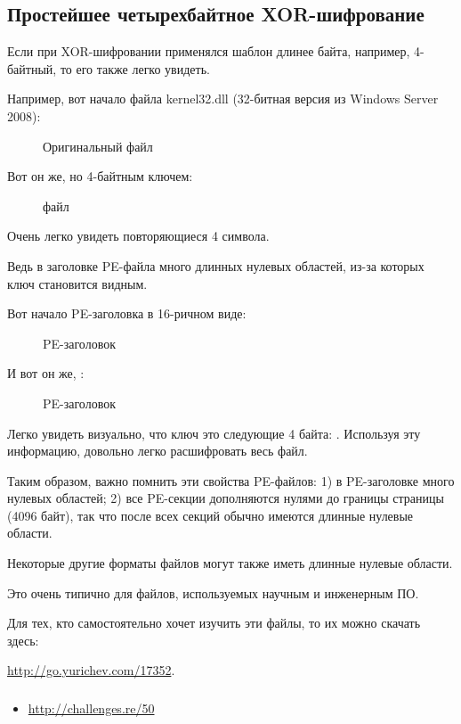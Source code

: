 \clearpage
\subsection{Простейшее четырехбайтное XOR-шифрование}

Если при XOR-шифровании применялся шаблон длинее байта, например, 4-байтный, то его также легко увидеть.

Например, вот начало файла kernel32.dll (32-битная версия из Windows Server 2008):

\begin{figure}[H]
\centering
{}
\caption{Оригинальный файл}
\end{figure}

\clearpage
Вот он же, но  4-байтным ключем:

\begin{figure}[H]
\centering
{}
\caption{ файл}
\end{figure}

Очень легко увидеть повторяющиеся 4 символа.

Ведь в заголовке PE-файла много длинных нулевых областей, из-за которых ключ становится видным.

\clearpage
Вот начало PE-заголовка в 16-ричном виде:

\begin{figure}[H]
\centering
{}
\caption{PE-заголовок}
\end{figure}

\clearpage
И вот он же, :

\begin{figure}[H]
\centering
{}
\caption{ PE-заголовок}
\end{figure}

Легко увидеть визуально, что ключ это следующие 4 байта: .
Используя эту информацию, довольно легко расшифровать весь файл.

Таким образом, важно помнить эти свойства PE-файлов:
1) в PE-заголовке много нулевых областей;
2) все PE-секции дополняются нулями до границы страницы (4096 байт), 
так что после всех секций обычно имеются длинные нулевые области.

Некоторые другие форматы файлов могут также иметь длинные нулевые области.

Это очень типично для файлов, используемых научным и инженерным ПО.

Для тех, кто самостоятельно хочет изучить эти файлы, то их можно скачать здесь:

\url{http://go.yurichev.com/17352}.

\subsubsection{\Exercise}

\begin{itemize}
	\item \url{http://challenges.re/50}
\end{itemize}

